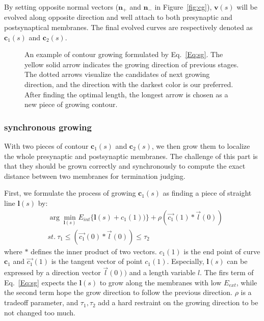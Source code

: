 By setting opposite normal vectors ($\mathbf{n}_{+}$ and $\mathbf{n}_{-}$ in Figure~\ref{fig:cg}), $\mathbf{v}(s)$ will be evolved along opposite direction and well attach to both presynaptic and postsynaptical membranes.
The final evolved curves are respectively denoted as $\mathbf{c}_1(s)$ and $\mathbf{c}_2(s)$.

\begin{figure}[t]
\begin{minipage}[b]{1.0\linewidth}
  \centering
 \centerline{}
\end{minipage}
\caption{An example of contour growing formulated by Eq.~\ref{Eq:sg}.
        The yellow solid arrow indicates the growing direction of previous stages.
        The dotted arrows visualize the candidates of next growing direction, and the direction with the darkest color is our preferred.
        After finding the optimal length, the longest arrow is chosen as a new piece of growing contour.}
\label{fig:g}
\end{figure}

\subsubsection{synchronous growing}
With two pieces of contour $\mathbf{c}_1(s)$ and $\mathbf{c}_2(s)$, we then grow them to localize the whole presynaptic and postsynaptic membranes.
The challenge of this part is that they should be grown correctly and synchronously to compute the exact distance between two membranes for termination judging.

First, we formulate the process of growing $\mathbf{c}_1(s)$ as finding a piece of straight line $\mathbf{l}(s)$ by:
\begin{eqnarray}\label{Eq:sg}
&\arg\min_{\mathbf{l}(s)} E_{int}\{\mathbf{l}(s)+c_1(1))\}+\rho(\overrightarrow{c_1}(1)*\overrightarrow{l}(0))\\
&st.~\tau_1\leq (\overrightarrow{c_1}(0)*\overrightarrow{l}(0))\leq \tau_2\nonumber
\end{eqnarray}
where $*$ defines the inner product of two vectors.
$c_1(1)$ is the end point of curve $\mathbf{c}_1$ and $\overrightarrow{c_1}(1)$ is the tangent vector of point $c_1(1)$.
Especially, $\mathbf{l}(s)$ can be expressed by a direction vector $\overrightarrow{l}(0))$ and a length variable $l$.
The firs term of Eq.~\ref{Eq:sg} expects the $\mathbf{l}(s)$ to grow along the membranes with low $E_{ext}$, while the second term hope the grow direction to follow the previous direction.
$\rho$ is a tradeoff parameter, and $\tau_1,\tau_2$ add a hard restraint on the growing direction to be not changed too much.

